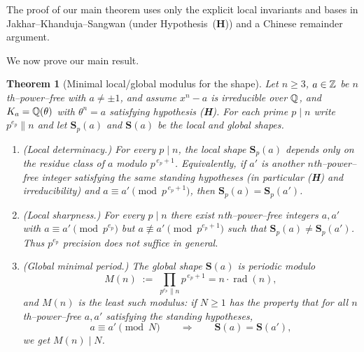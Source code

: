 \documentclass[12pt,a4paper,oneside]{amsart}
\newtheorem{theorem}{Theorem}[section]
\theoremstyle{definition}
\DeclareMathOperator{\rad}{rad}
\begin{document}
The proof of our main theorem uses only the explicit local invariants and bases in
Jakhar--Khanduja--Sangwan \cite{JKS21} (under Hypothesis~(\textbf{H})) and a Chinese remainder argument.

We now prove our main result.


\begin{theorem}[Minimal local/global modulus for the shape]\label{thm:minimal-modulus}
Let $n\ge 3$, $a\in\Bbb Z$ be $n$th–power–free with $a\neq\pm1$, and assume $x^n-a$ is irreducible over $\Bbb Q$, and $K_a=\Bbb Q(\theta)$ with $\theta^n=a$ satisfying hypothesis (\textbf{H}). For each prime $p\mid n$ write $p^{e_p}\parallel n$ and let $\mathbf S_p(a)$ and $\mathbf S(a)$ be the local and global shapes.
\begin{enumerate}
\item[\textup{(i)}] \textup{(Local determinacy.)} For every $p\mid n$, the local shape $\mathbf S_p(a)$ depends only on the residue class of $a$ modulo $p^{\,e_p+1}$. Equivalently, if $a'$ is another $n$th--power--free integer satisfying the same standing hypotheses (in particular (\textbf{H}) and irreducibility) and $a\equiv a'\pmod{p^{\,e_p+1}}$, then $\mathbf S_p(a)=\mathbf S_p(a')$.

\item[\textup{(ii)}] \textup{(Local sharpness.)} For every $p\mid n$ there exist $n$th–power–free integers $a,a'$ with $a\equiv a'\pmod{p^{e_p}}$ but $a\not\equiv a'\pmod{p^{e_p+1}}$ such that $\mathbf S_p(a)\ne\mathbf S_p(a')$. Thus $p^{e_p}$ precision does not suffice in general.
\item[\textup{(iii)}] \textup{(Global minimal period.)} The global shape $\mathbf S(a)$ is periodic modulo
\[
M(n)\;:=\;\prod_{p^{e_p}\parallel n} p^{\,e_p+1}=n\cdot\rad(n),
\]
and $M(n)$ is the \emph{least} such modulus: if $N\ge1$ has the property that for all $n$th--power--free $a,a'$ satisfying the standing hypotheses,
\[
a\equiv a'\pmod N\qquad\Longrightarrow\qquad \mathbf S(a)=\mathbf S(a'),
\]
we get $M(n)\mid N$.
\end{enumerate}
\end{theorem}
\end{document}
